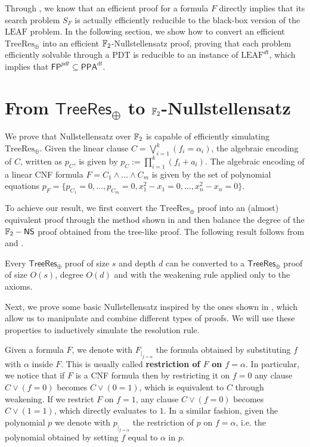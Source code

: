 Through , we know that an efficient proof for a formula $F$ directly implies that its search problem $S_F$ is actually efficiently reducible to the black-box version of the $\mathrm{LEAF}$ problem. In the following section, we show how to convert an efficient $\mathrm{TreeRes}_\oplus$ into an efficient $\mathbb{F}_2$-Nullstellensatz proof, proving that each problem efficiently solvable through a PDT is reducible to an instance of $\mathrm{LEAF}^{dt}$, which implies that $\mathsf{FP}^{pdt} \subseteq \mathsf{PPA}^{dt}$.

\section{From $\mathsf{TreeRes}_\oplus$ to $\mathbb{F}_2$-Nullstellensatz}

We prove that Nullstellensatz over $\mathbb{F}_2$ is capable of efficiently simulating $\mathrm{TreeRes}_\oplus$. Given the linear clause $C = \bigvee_{i = 1}^k (f_i = \alpha_i)$, the algebraic encoding of $C$, written as $p_C$, is given by $p_C := \prod_{i = 1}^{k} (f_i + a_i)$. The algebraic encoding of a linear CNF formula $F = C_1 \land \ldots \land C_m$ is given by the set of polynomial equations $p_F = \{p_{C_1} = 0, \ldots, p_{C_m} = 0, x_1^2-x_1 = 0, \ldots, x_n^2-x_n = 0\}$.

To achieve our result, we first convert the $\mathrm{TreeRes}_\oplus$ proof into an (almost) equivalent proof through the method shown in  and then balance the degree of the $\mathsf{\mathbb{F}_2-NS}$ proof obtained from the tree-like proof. The following result follows from  and .

\begin{corollary}
    \label{leaf_weakening}
 Every $\mathsf{TreeRes}_{\oplus}$ proof of size $s$ and depth $d$ can be converted to a $\mathsf{TreeRes}_{\oplus}$ proof of size $O(s)$, degree $O(d)$ and with the weakening rule applied only to the axioms.
\end{corollary}

Next, we prove some basic Nullstellensatz inspired by the ones shown in \cite{groebner}, which allow us to manipulate and combine different types of proofs. We will use these properties to inductively simulate the resolution rule.

Given a formula $F$, we denote with $F_{\mid_{f = \alpha}}$ the formula obtained by substituting $f$ with $\alpha$ inside $F$. This is usually called \textbf{restriction of $F$ on $f = \alpha$}. In particular, we notice that if $F$ is a CNF formula then by restricting it on $f = 0$ any clause $C \lor (f = 0)$ becomes $C \lor (0 = 1)$, which is equivalent to $C$ through weakening. If we restrict $F$ on $f = 1$, any clause $C \lor (f = 0)$ becomes $C \lor (1=1)$, which directly evaluates to $1$.
In a similar fashion, given the polynomial $p$ we denote with $p_{\mid_{f = \alpha}}$ the restriction of $p$ on $f = \alpha$, i.e. the polynomial obtained by setting $f$ equal to $\alpha$ in $p$.

